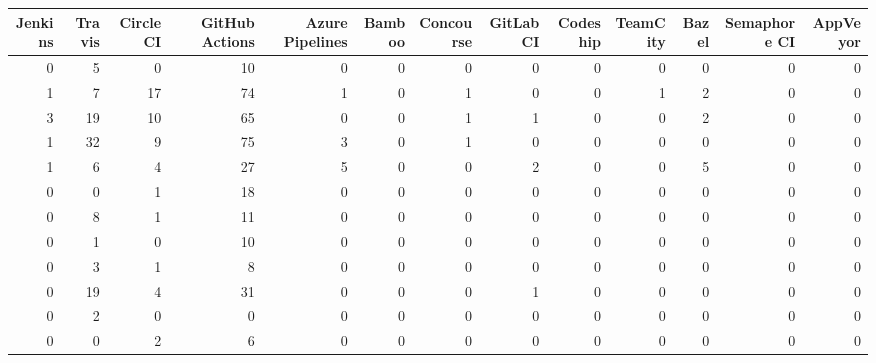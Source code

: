\begin{tabular}{rrrrrrrrrrrrr}
\toprule
 Jenkins &  Travis &  Circle CI &  GitHub Actions &  Azure Pipelines &  Bamboo &  Concourse &  GitLab CI &  Codeship &  TeamCity &  Bazel &  Semaphore CI &  AppVeyor \\
\midrule
       0 &       5 &          0 &              10 &                0 &       0 &          0 &          0 &         0 &         0 &      0 &             0 &         0 \\
       1 &       7 &         17 &              74 &                1 &       0 &          1 &          0 &         0 &         1 &      2 &             0 &         0 \\
       3 &      19 &         10 &              65 &                0 &       0 &          1 &          1 &         0 &         0 &      2 &             0 &         0 \\
       1 &      32 &          9 &              75 &                3 &       0 &          1 &          0 &         0 &         0 &      0 &             0 &         0 \\
       1 &       6 &          4 &              27 &                5 &       0 &          0 &          2 &         0 &         0 &      5 &             0 &         0 \\
       0 &       0 &          1 &              18 &                0 &       0 &          0 &          0 &         0 &         0 &      0 &             0 &         0 \\
       0 &       8 &          1 &              11 &                0 &       0 &          0 &          0 &         0 &         0 &      0 &             0 &         0 \\
       0 &       1 &          0 &              10 &                0 &       0 &          0 &          0 &         0 &         0 &      0 &             0 &         0 \\
       0 &       3 &          1 &               8 &                0 &       0 &          0 &          0 &         0 &         0 &      0 &             0 &         0 \\
       0 &      19 &          4 &              31 &                0 &       0 &          0 &          1 &         0 &         0 &      0 &             0 &         0 \\
       0 &       2 &          0 &               0 &                0 &       0 &          0 &          0 &         0 &         0 &      0 &             0 &         0 \\
       0 &       0 &          2 &               6 &                0 &       0 &          0 &          0 &         0 &         0 &      0 &             0 &         0 \\

\end{tabular}
